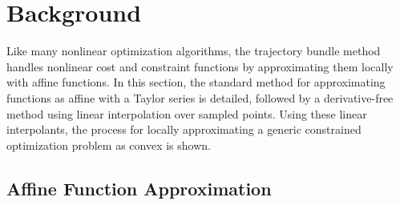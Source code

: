 



\section{Background}\label{sec:bundles:background}
Like many nonlinear optimization algorithms, the trajectory bundle method handles nonlinear cost and constraint functions by approximating them locally with affine functions. In this section, the standard method for approximating functions as affine with a Taylor series is detailed, followed by a derivative-free method using linear interpolation over sampled points.  Using these linear interpolants, the process for locally approximating a generic constrained optimization problem as convex is shown. 
%
%
\subsection{Affine Function Approximation}\label{btb:sect:interp}
%
%



